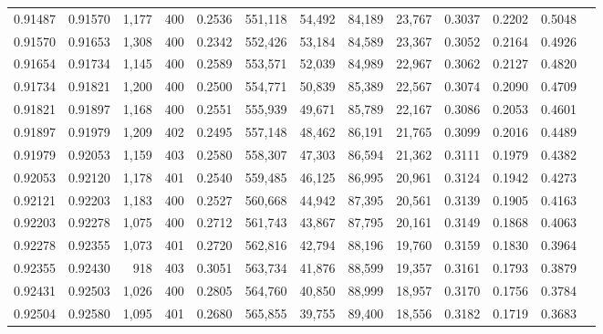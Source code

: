\begin{tabular}{rrrrrrrrrrrrr}
0.91487 & 0.91570 & 1,177 & 400 &                                     0.2536 & 551,118 &  54,492 &  84,189 &  23,767 & 0.3037 & 0.2202 & 0.5048 \\
0.91570 & 0.91653 & 1,308 & 400 &                                     0.2342 & 552,426 &  53,184 &  84,589 &  23,367 & 0.3052 & 0.2164 & 0.4926 \\
0.91654 & 0.91734 & 1,145 & 400 &                                     0.2589 & 553,571 &  52,039 &  84,989 &  22,967 & 0.3062 & 0.2127 & 0.4820 \\
0.91734 & 0.91821 & 1,200 & 400 &                                     0.2500 & 554,771 &  50,839 &  85,389 &  22,567 & 0.3074 & 0.2090 & 0.4709 \\
0.91821 & 0.91897 & 1,168 & 400 &                                     0.2551 & 555,939 &  49,671 &  85,789 &  22,167 & 0.3086 & 0.2053 & 0.4601 \\
0.91897 & 0.91979 & 1,209 & 402 &                                     0.2495 & 557,148 &  48,462 &  86,191 &  21,765 & 0.3099 & 0.2016 & 0.4489 \\
0.91979 & 0.92053 & 1,159 & 403 &                                     0.2580 & 558,307 &  47,303 &  86,594 &  21,362 & 0.3111 & 0.1979 & 0.4382 \\
0.92053 & 0.92120 & 1,178 & 401 &                                     0.2540 & 559,485 &  46,125 &  86,995 &  20,961 & 0.3124 & 0.1942 & 0.4273 \\
0.92121 & 0.92203 & 1,183 & 400 &                                     0.2527 & 560,668 &  44,942 &  87,395 &  20,561 & 0.3139 & 0.1905 & 0.4163 \\
0.92203 & 0.92278 & 1,075 & 400 &                                     0.2712 & 561,743 &  43,867 &  87,795 &  20,161 & 0.3149 & 0.1868 & 0.4063 \\
0.92278 & 0.92355 & 1,073 & 401 &                                     0.2720 & 562,816 &  42,794 &  88,196 &  19,760 & 0.3159 & 0.1830 & 0.3964 \\
0.92355 & 0.92430 &   918 & 403 &                                     0.3051 & 563,734 &  41,876 &  88,599 &  19,357 & 0.3161 & 0.1793 & 0.3879 \\
0.92431 & 0.92503 & 1,026 & 400 &                                     0.2805 & 564,760 &  40,850 &  88,999 &  18,957 & 0.3170 & 0.1756 & 0.3784 \\
0.92504 & 0.92580 & 1,095 & 401 &                                     0.2680 & 565,855 &  39,755 &  89,400 &  18,556 & 0.3182 & 0.1719 & 0.3683 \\

\end{tabular}

